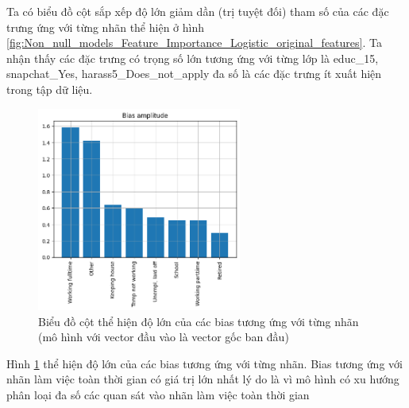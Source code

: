 \begin{enumerate}[label=(\alph*)]
    Ta có biểu đồ cột sắp xếp độ lớn giảm dần (trị tuyệt đối) tham số của các đặc trưng ứng với từng nhãn thể hiện ở hình \ref{fig:Non_null_models_Feature_Importance_Logistic_original_features}.
    Ta nhận thấy các đặc trưng có trọng số lớn tương ứng với từng lớp là educ\_15, snapchat\_Yes, harass5\_Does\_not\_apply đa số là các đặc trưng ít xuất hiện trong tập dữ liệu.

    \begin{figure}[H]
        \centering
        \includegraphics[width=0.6\textwidth]{figures/Thanh/Models/Logistic/Non_null_models_Bias_Importance_Logistic_original_features.png}
        \caption{Biểu đồ cột thể hiện độ lớn của các bias tương ứng với từng nhãn (mô hình với vector đầu vào là vector gốc ban đầu)}
        \label{fig:Non_null_models_Bias_Importance_Logistic_original_features.png}
    \end{figure}

    Hình \ref{fig:Non_null_models_Bias_Importance_Logistic_original_features.png} thể hiện độ lớn của các bias tương ứng với từng nhãn.
    Bias tương ứng với nhãn làm việc toàn thời gian có giá trị lớn nhất lý do là vì mô hình có xu hướng phân loại đa số các quan sát vào nhãn làm việc toàn thời gian
\end{enumerate}